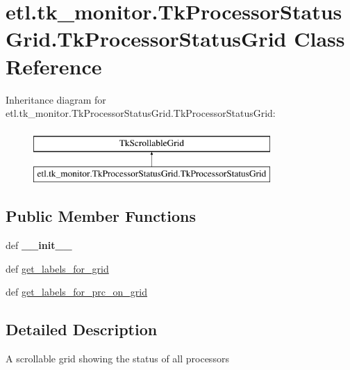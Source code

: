 \hypertarget{classetl_1_1tk__monitor_1_1TkProcessorStatusGrid_1_1TkProcessorStatusGrid}{\section{etl.\-tk\-\_\-monitor.\-Tk\-Processor\-Status\-Grid.\-Tk\-Processor\-Status\-Grid Class Reference}
\label{classetl_1_1tk__monitor_1_1TkProcessorStatusGrid_1_1TkProcessorStatusGrid}
}
Inheritance diagram for etl.\-tk\-\_\-monitor.\-Tk\-Processor\-Status\-Grid.\-Tk\-Processor\-Status\-Grid\-:\begin{figure}[H]
\begin{center}
\leavevmode
\includegraphics[height=2.000000cm]{classetl_1_1tk__monitor_1_1TkProcessorStatusGrid_1_1TkProcessorStatusGrid}
\end{center}
\end{figure}
\subsection*{Public Member Functions}
\begin{DoxyCompactItemize}
\item 
\hypertarget{classetl_1_1tk__monitor_1_1TkProcessorStatusGrid_1_1TkProcessorStatusGrid_ade5afc25ec51148040cfb25eb33684fe}{def {\bfseries \-\_\-\-\_\-init\-\_\-\-\_\-}}\label{classetl_1_1tk__monitor_1_1TkProcessorStatusGrid_1_1TkProcessorStatusGrid_ade5afc25ec51148040cfb25eb33684fe}

\item 
def \hyperlink{classetl_1_1tk__monitor_1_1TkProcessorStatusGrid_1_1TkProcessorStatusGrid_ac27896e2b7af840fc8caa646ad0f3763}{get\-\_\-labels\-\_\-for\-\_\-grid}
\item 
def \hyperlink{classetl_1_1tk__monitor_1_1TkProcessorStatusGrid_1_1TkProcessorStatusGrid_a836630b3c2d0588bcbf19c344c285d37}{get\-\_\-labels\-\_\-for\-\_\-prc\-\_\-on\-\_\-grid}
\end{DoxyCompactItemize}


\subsection{Detailed Description}
\begin{DoxyVerb}A scrollable grid showing the status of all processors\end{DoxyVerb}
 

